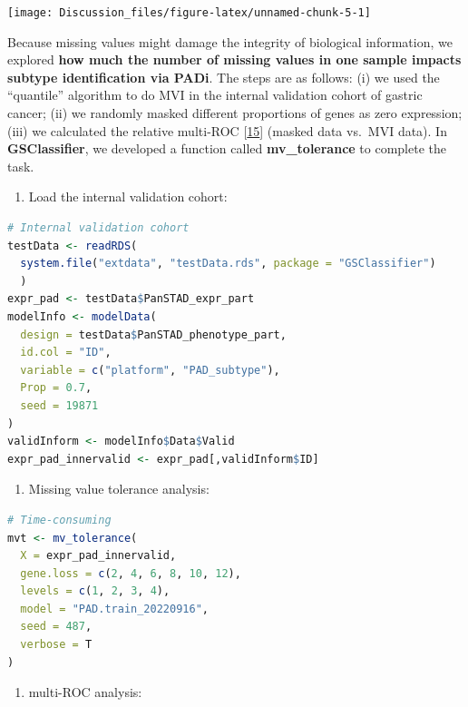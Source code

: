 \documentclass[
  12pt,
]{book}
\providecommand{\tightlist}{%
  \setlength{\itemsep}{0pt}\setlength{\parskip}{0pt}}
\begin{document}
\begin{center}\texttt{[image: Discussion\_files/figure-latex/unnamed-chunk-5-1]} \end{center}

Because missing values might damage the integrity of biological information, we explored \textbf{how much the number of missing values in one sample impacts subtype identification via PADi}. The steps are as follows: (i) we used the ``quantile'' algorithm to do MVI in the internal validation cohort of gastric cancer; (ii) we randomly masked different proportions of genes as zero expression; (iii) we calculated the relative multi-ROC {[}\protect\hyperlink{ref-pROC}{15}{]} (masked data vs.~MVI data). In \textbf{GSClassifier}, we developed a function called \textbf{mv\_tolerance} to complete the task.

\begin{enumerate}
\def\labelenumi{(\roman{enumi})}
\tightlist
\item
  Load the internal validation cohort:
\end{enumerate}

\begin{lstlisting}[language=R]
# Internal validation cohort
testData <- readRDS(
  system.file("extdata", "testData.rds", package = "GSClassifier")
  )
expr_pad <- testData$PanSTAD_expr_part
modelInfo <- modelData(
  design = testData$PanSTAD_phenotype_part,
  id.col = "ID",
  variable = c("platform", "PAD_subtype"),
  Prop = 0.7,
  seed = 19871
)
validInform <- modelInfo$Data$Valid
expr_pad_innervalid <- expr_pad[,validInform$ID]
\end{lstlisting}

\begin{enumerate}
\def\labelenumi{(\roman{enumi})}
\setcounter{enumi}{1}
\tightlist
\item
  Missing value tolerance analysis:
\end{enumerate}

\begin{lstlisting}[language=R]
# Time-consuming
mvt <- mv_tolerance(
  X = expr_pad_innervalid,
  gene.loss = c(2, 4, 6, 8, 10, 12),
  levels = c(1, 2, 3, 4),
  model = "PAD.train_20220916",
  seed = 487,
  verbose = T
)
\end{lstlisting}

\begin{enumerate}
\def\labelenumi{(\roman{enumi})}
\setcounter{enumi}{2}
\tightlist
\item
  multi-ROC analysis:
\end{enumerate}
\end{document}
